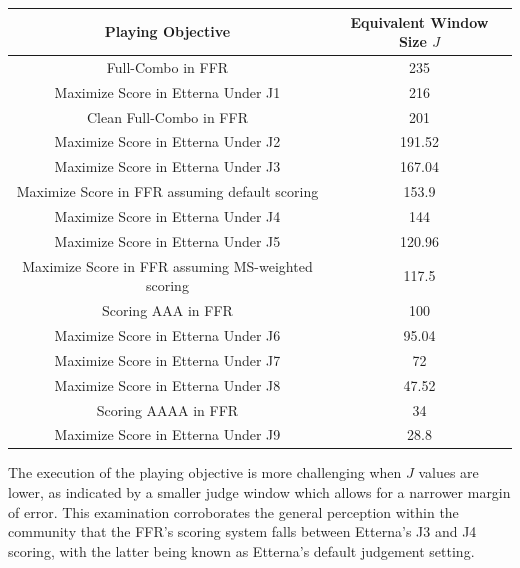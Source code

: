\begin{center}
	\begin{tabular}{c@{\hskip 5mm}c}
		\hspace{5mm} \textbf{Playing Objective} \hspace{5mm} & \textbf{Equivalent Window Size} $J$ \\
            \hline
		Full-Combo in FFR                              & 235                        \\
            Maximize Score in Etterna Under J1 & 216\\
		Clean Full-Combo in FFR                                 & 201                         \\
            Maximize Score in Etterna Under J2 & 191.52\\
            Maximize Score in Etterna Under J3 & 167.04\\
		Maximize Score in FFR assuming default scoring                              & 153.9                       \\
            Maximize Score in Etterna Under J4 & 144\\
            Maximize Score in Etterna Under J5 & 120.96\\
		Maximize Score in FFR assuming MS-weighted scoring                                  & 117.5                       \\
  
		Scoring AAA in FFR                                   & 100                    \\
            Maximize Score in Etterna Under J6 & 95.04\\
            Maximize Score in Etterna Under J7 & 72\\
            Maximize Score in Etterna Under J8 & 47.52\\
		Scoring AAAA in FFR                                   & 34                       \\
            Maximize Score in Etterna Under J9 & 28.8\\
	\end{tabular}
\end{center}

The execution of the playing objective is more challenging when $J$ values are lower, as indicated by a smaller judge window which allows for a narrower margin of error. This examination corroborates the general perception within the community that the FFR's scoring system falls between Etterna's J3 and J4 scoring, with the latter being known as Etterna's default judgement setting. 


